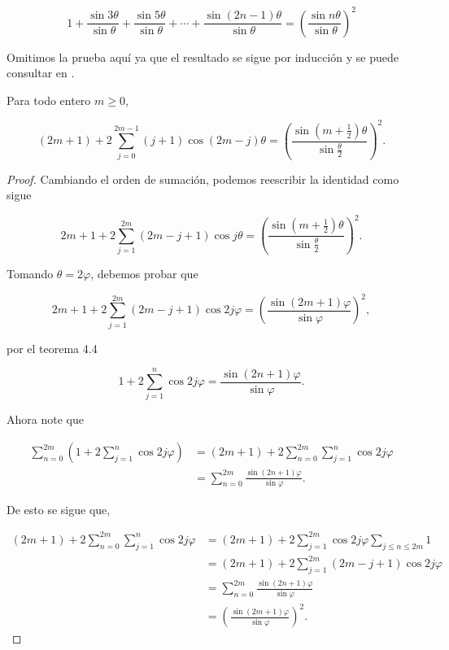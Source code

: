  \begin{lemma}
$$1+\frac{\sin 3 \theta}{\sin \theta}+\frac{\sin 5 \theta}{\sin \theta}+\cdots+\frac{\sin (2 n-1) \theta}{\sin \theta}=\left(\frac{\sin n \theta}{\sin \theta}\right)^2$$
 \end{lemma}

Omitimos la prueba aquí ya que el resultado se sigue por inducción y se puede consultar en \cite{murty2007problems}.

 \begin{theorem}
     Para todo entero $m\geq 0$,

     $$(2 m+1)+2 \sum_{j=0}^{2 m-1}(j+1) \cos (2 m-j) \theta=\left(\frac{\sin \left(m+\frac{1}{2}\right) \theta}{\sin \frac{\theta}{2}}\right)^2.$$
 \end{theorem}

 \begin{proof}
     Cambiando el orden de sumación, podemos reescribir la identidad como  sigue 

     $$2 m+1+2 \sum_{j=1}^{2 m}(2 m-j+1) \cos j \theta=\left(\frac{\sin \left(m+\frac{1}{2}\right) \theta}{\sin \frac{\theta}{2}}\right)^2 .$$

     Tomando $\theta=2\varphi$, debemos probar que

     $$2 m+1+2 \sum_{j=1}^{2 m}(2 m-j+1) \cos 2 j \varphi=\left(\frac{\sin (2 m+1) \varphi}{\sin \varphi}\right)^2,$$

     por el teorema 4.4

     $$1+2 \sum_{j=1}^n \cos 2 j \varphi=\frac{\sin (2 n+1) \varphi}{\sin \varphi}.$$

     Ahora note que 

     \begin{align*}
         \sum_{n=0}^{2m}(1+2 \sum_{j=1}^n \cos 2 j \varphi)&=(2m+1)+2 \sum_{n=0}^{2m}\sum_{j=1}^n \cos 2 j \varphi\\
         &=\sum_{n=0}^{2m}\frac{\sin (2 n+1) \varphi}{\sin \varphi}
     .\end{align*}

     De esto se sigue que,

     \begin{align*}
         (2m+1)+2 \sum_{n=0}^{2m}\sum_{j=1}^n \cos 2 j \varphi&=(2 m+1)+2 \sum_{j=1}^{2 m} \cos 2 j \varphi \sum_{j \leq n \leq 2 m} 1\\
         &=(2 m+1)+2 \sum_{j=1}^{2 m}(2 m-j+1) \cos 2 j \varphi\\
         &=\sum_{n=0}^{2 m} \frac{\sin (2 n+1) \varphi}{\sin \varphi}\\
         &=\left(\frac{\sin (2 m+1) \varphi}{\sin \varphi}\right)^2
     .\end{align*}
 \end{proof}

